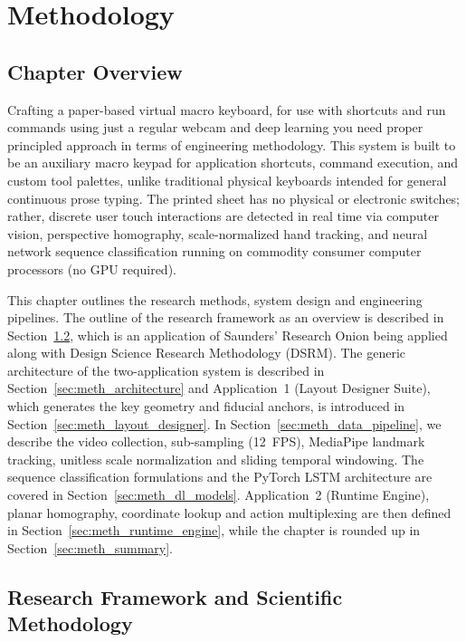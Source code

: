 \chapter{Methodology}
\label{ch:methodology}

\section{Chapter Overview}
\label{sec:meth_chapter_overview}
Crafting a paper-based virtual macro keyboard, for use with shortcuts and run commands using just a regular webcam and deep learning you need proper principled approach in terms of engineering methodology. This system is built to be an auxiliary macro keypad for application shortcuts, command execution, and custom tool palettes, unlike traditional physical keyboards intended for general continuous prose typing. The printed sheet has no physical or electronic switches; rather, discrete user touch interactions are detected in real time via computer vision, perspective homography, scale-normalized hand tracking, and neural network sequence classification running on commodity consumer computer processors (no GPU required).

This chapter outlines the research methods, system design and engineering pipelines. The outline of the research framework as an overview is described in Section~\ref{sec:meth_framework}, which is an application of Saunders' Research Onion being applied along with Design Science Research Methodology (DSRM). The generic architecture of the two-application system is described in Section~\ref{sec:meth_architecture} and Application~1 (Layout Designer Suite), which generates the key geometry and fiducial anchors, is introduced in Section~\ref{sec:meth_layout_designer}. In Section~\ref{sec:meth_data_pipeline}, we describe the video collection, sub-sampling (12~FPS), MediaPipe landmark tracking, unitless scale normalization and sliding temporal windowing. The sequence classification formulations and the PyTorch LSTM architecture are covered in Section~\ref{sec:meth_dl_models}. Application~2 (Runtime Engine), planar homography, coordinate lookup and action multiplexing are then defined in Section~\ref{sec:meth_runtime_engine}, while the chapter is rounded up in Section~\ref{sec:meth_summary}.

\section{Research Framework and Scientific Methodology}
\label{sec:meth_framework}

